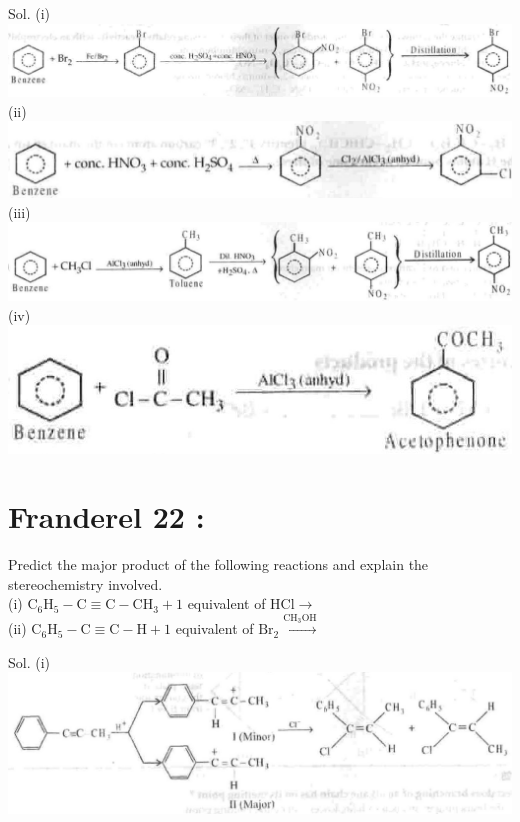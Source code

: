 \documentclass[10pt]{article}
\begin{document}
Sol. (i)\\
\includegraphics[max width=\textwidth, center]{2025_01_28_8470952b98110cec3aabg-223(2)}\\
(ii)\\
\includegraphics[max width=\textwidth, center]{2025_01_28_8470952b98110cec3aabg-223(4)}\\
(iii)\\
\includegraphics[max width=\textwidth, center]{2025_01_28_8470952b98110cec3aabg-223(1)}\\
(iv)\\
\includegraphics[max width=\textwidth, center]{2025_01_28_8470952b98110cec3aabg-223}

\section*{Franderel 22 :}
Predict the major product of the following reactions and explain the stereochemistry involved.\\
(i) $\mathrm{C}_{6} \mathrm{H}_{5}-\mathrm{C} \equiv \mathrm{C}-\mathrm{CH}_{3}+1$ equivalent of $\mathrm{HCl} \longrightarrow$\\
(ii) $\mathrm{C}_{6} \mathrm{H}_{5}-\mathrm{C} \equiv \mathrm{C}-\mathrm{H}+1$ equivalent of $\mathrm{Br}_{2} \xrightarrow{\mathrm{CH}_{3} \mathrm{OH}}$

Sol. (i)\\
\includegraphics[max width=\textwidth, center]{2025_01_28_8470952b98110cec3aabg-223(3)}
\end{document}
